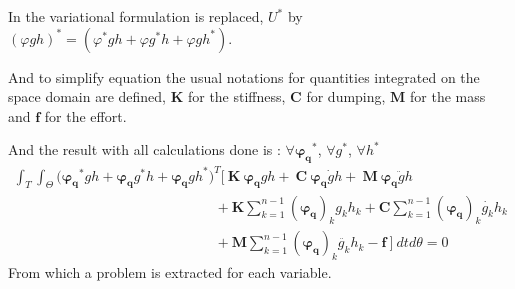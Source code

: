 \documentclass[12pt,a4paper]{article}
\begin{document}
In the variational formulation is replaced, $U^* $ by $ (\varphi gh)^* = ( \varphi^*gh+\varphi g^*h+\varphi gh^*) $.

And to simplify equation the usual notations for quantities integrated on the space domain are defined, $\mathbf{K}$ for the stiffness, $\mathbf{C}$ for dumping, $\mathbf{M}$ for the mass and $\mathbf{f}$ for the effort.

And the result with all calculations done is : $\forall\boldsymbol{\varphi_q}^*$, $\forall g^*$, $\forall h^*$
\begin{equation}
\begin{array}{l}
	\displaystyle	
	\int_T \! \int_\Theta	\!\!
		\big(\boldsymbol{\varphi_q}^*gh + \boldsymbol{\varphi_q}g^*h + \boldsymbol{\varphi_q}gh^*\big)^T \!
					\bigg[~\mathbf{K}~ \boldsymbol{\varphi_q}gh
						+ ~\mathbf{C}~ \boldsymbol{\varphi_q} \dot{g}h 
						+ ~\mathbf{M}~ \boldsymbol{\varphi_q} \ddot{g}h
	\\ 
	  \displaystyle
		\phantom{\int_T\int_\Theta\big(\boldsymbol{\varphi_q}^{*T}gh + \boldsymbol{\varphi_q}g^*h + \boldsymbol{\varphi_q}gh^*}
			+ \mathbf{K} \sum_{k=1}^{n-1} (\boldsymbol{\varphi_q})_k       g_k  h_k 
			+ \mathbf{C} \sum_{k=1}^{n-1} (\boldsymbol{\varphi_q})_k  \dot{g_k} h_k 
	\\ \displaystyle
	  
		\phantom{\int_T\int_\Theta\big(\boldsymbol{\varphi_q}^{*T}gh + \boldsymbol{\varphi_q}g^*h + \boldsymbol{\varphi_q}gh^*} 
			+ \mathbf{M} \sum_{k=1}^{n-1} (\boldsymbol{\varphi_q})_k \ddot{g_k} h_k
			-\mathbf{f}~\bigg] ~dt d\theta
	= 0
\end{array}
\end{equation}
From which a problem is extracted for each variable.
\end{document}

